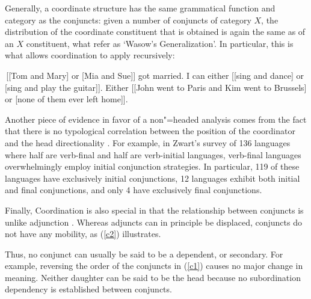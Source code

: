 \documentclass[output=paper
                ,modfonts
                ,nonflat
	        ,collection
	        ,collectionchapter
	        ,collectiontoclongg
 	        ,biblatex
                ,babelshorthands
                ,newtxmath
                ,draftmode
                ,colorlinks, citecolor=brown
]{./langsci/langscibook}
\begin{document}
Generally, a coordinate structure has the same grammatical function and category as the conjuncts: given a number of
conjuncts of category $X$, the distribution of the coordinate constituent that is obtained is again the same
as of an $X$ constituent, what \citet{pullumzwicky} refer as `Wasow's Generalization'.
In particular, this is what allows coordination to apply recursively:

\begin{exe}
\ex
\begin{xlista}
\ex \,[[Tom and Mary] or [Mia and Sue]] got married.
\ex I can either [[sing and dance] or [sing and play the guitar]].
\ex Either [[John went to Paris and Kim went to Brussels] or
[none of them ever left home]].
\end{xlista}
\end{exe}

Another piece of evidence in favor of a non"=headed analysis comes from the fact that there is no typological correlation between the position of the coordinator and the head directionality \citet{zwart}. For example, in Zwart's  survey of 136 languages where half are verb-final and half
are verb-initial languages,  verb-final languages overwhelmingly employ initial conjunction strategies.
In particular, 119 of these languages have exclusively initial conjunctions, 12 languages exhibit both initial
and final conjunctions, and only 4 have exclusively final conjunctions. 


Finally, Coordination is also special in that the relationship between conjuncts is unlike adjunction \citep{levinepostal}.
Whereas adjuncts can in principle be displaced, conjuncts do not have any mobility, as (\ref{c2}) illustrates.

\begin{exe}
\ex
\begin{xlista}
\end{xlista}\label{c2}
\end{exe}


\noindent
Thus, no conjunct can usually be said to be a dependent, or secondary. For example,  reversing the order of the conjuncts in (\ref{c1}) causes no major change in meaning. Neither daughter can be said to be the head because no subordination dependency is established between conjuncts.
\end{document}
